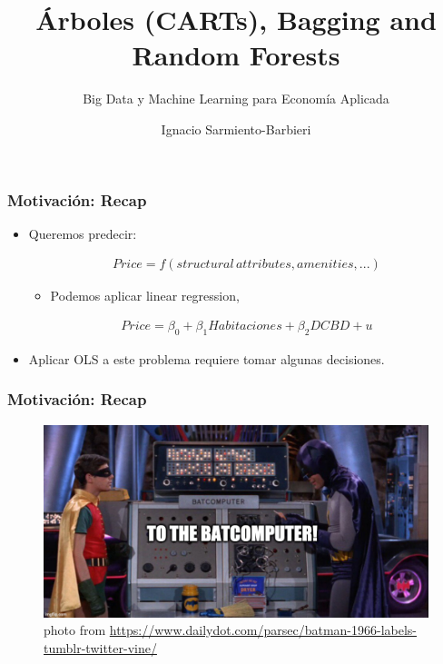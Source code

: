 \documentclass[
  shownotes,
  xcolor={svgnames},
  hyperref={colorlinks,citecolor=DarkBlue,linkcolor=andesred,urlcolor=DarkBlue}
  , aspectratio=169]{beamer}
\begin{document}
\title{Árboles (CARTs), Bagging and Random Forests}
\subtitle{Big Data y Machine Learning para Economía Aplicada}
\date{}

\author[Sarmiento-Barbieri]{Ignacio Sarmiento-Barbieri}


\begin{frame}[noframenumbering]
\maketitle
\end{frame}




\begin{frame}
\frametitle{Motivación: Recap}


\begin{itemize}
    \item Queremos predecir:

    \begin{align}
    Price=f(structural\,attributes,amenities,...)
    \end{align}
    \medskip
    \begin{itemize}
      \item Podemos aplicar linear regression,
    \end{itemize}
    \begin{align}
    Price=\beta_0 + \beta_1 Habitaciones + \beta_2 DCBD + u
    \end{align}
  \medskip

  \item Aplicar OLS a este problema requiere tomar algunas decisiones.
  


\end{itemize}
\end{frame}

\begin{frame}[fragile]
\frametitle{Motivación: Recap}
\begin{figure}[H] \centering
  \centering
  \includegraphics[scale=0.35]{figures/baticomputer_meme.jpg}
  \\
  \tiny photo from \url{https://www.dailydot.com/parsec/batman-1966-labels-tumblr-twitter-vine/}
\end{figure}

\end{frame}
\end{document}
